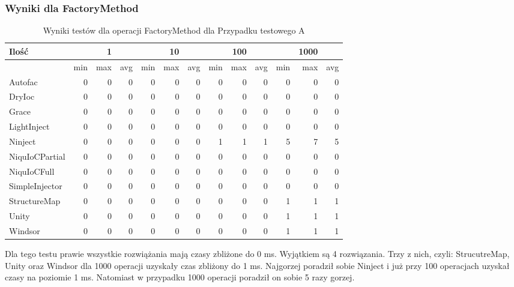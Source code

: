 \documentclass[12pt]{article}
\begin{document}
\subsubsection{Wyniki dla FactoryMethod}
\begin{table}[H]
\captionsetup{belowskip=0pt,aboveskip=0pt}
\begin{center}
\begin{small}
	\begin{tabular}{ | l | r r r | r r r | r r r | r r r | }
    		\hline
Ilość & & 1 & & & 10 & & & 100 & & & 1000 & \\ \hline
 & min & max & avg & min & max & avg & min & max & avg & min & max & avg \\ \hline
Autofac & 0 & 0 & 0 & 0 & 0 & 0 & 0 & 0 & 0 & 0 & 0 & 0 \\ \hline
DryIoc & 0 & 0 & 0 & 0 & 0 & 0 & 0 & 0 & 0 & 0 & 0 & 0 \\ \hline
Grace & 0 & 0 & 0 & 0 & 0 & 0 & 0 & 0 & 0 & 0 & 0 & 0 \\ \hline
LightInject & 0 & 0 & 0 & 0 & 0 & 0 & 0 & 0 & 0 & 0 & 0 & 0 \\ \hline
Ninject & 0 & 0 & 0 & 0 & 0 & 0 & 1 & 1 & 1 & 5 & 7 & 5 \\ \hline
NiquIoCPartial & 0 & 0 & 0 & 0 & 0 & 0 & 0 & 0 & 0 & 0 & 0 & 0 \\ \hline
NiquIoCFull & 0 & 0 & 0 & 0 & 0 & 0 & 0 & 0 & 0 & 0 & 0 & 0 \\ \hline
SimpleInjector & 0 & 0 & 0 & 0 & 0 & 0 & 0 & 0 & 0 & 0 & 0 & 0 \\ \hline
StructureMap & 0 & 0 & 0 & 0 & 0 & 0 & 0 & 0 & 0 & 1 & 1 & 1 \\ \hline
Unity & 0 & 0 & 0 & 0 & 0 & 0 & 0 & 0 & 0 & 1 & 1 & 1 \\ \hline
Windsor & 0 & 0 & 0 & 0 & 0 & 0 & 0 & 0 & 0 & 1 & 1 & 1 \\ \hline
  	\end{tabular}
\end{small}
\end{center}
\caption{Wyniki testów dla operacji FactoryMethod dla Przypadku testowego A}
\label{TestCaseA_FactoryMethod}
\end{table}
Dla tego testu prawie wszystkie rozwiążania mają czasy zbliżone do 0 ms. Wyjątkiem są 4 rozwiązania. Trzy z nich, czyli: StrucutreMap, Unity oraz Windsor dla 1000 operacji uzyskały czas zbliżony do 1 ms. Najgorzej poradził sobie Ninject i już przy 100 operacjach uzyskał czasy na poziomie 1 ms. Natomiast w przypadku 1000 operacji poradził on sobie 5 razy gorzej.
\end{document}
